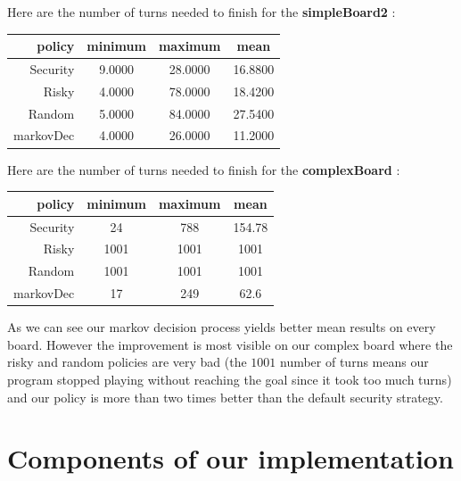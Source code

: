 \documentclass{eplDoc}
\begin{document}
Here are the number of turns needed to finish for the \textbf{simpleBoard2} : 


\begin{center}
		\begin{tabular}{|r|ccc|}
			\hline
			policy & minimum & maximum & mean \\ 
			\hline
			 Security &     9.0000  & 28.0000  & 16.8800 \\
    Risky & 4.0000  & 78.0000 &  18.4200 \\ 
    Random & 5.0000  & 84.0000 &  27.5400 \\ 
    markovDec & 4.0000 &  26.0000  & 11.2000  \\ 
   		\hline
		\end{tabular}
\end{center}

Here are the number of turns needed to finish for the \textbf{complexBoard} : 


\begin{center}
		\begin{tabular}{|r|ccc|}
			\hline  
			policy & minimum & maximum & mean \\ 
			\hline
			 Security &                            24          &             788         &           154.78 \\
       Risky &               1001           &           1001          &            1001 \\ 
       Random &               1001        &             1001             &         1001 \\ 
       markovDec &                 17         &              249             &         62.6 \\ 
 
   		\hline
		\end{tabular}
\end{center}

As we can see our markov decision process yields better mean results on every board. However the improvement is most visible on our complex board where the risky and random policies are very bad (the $1001$ number of turns means our program stopped playing without reaching the goal since it took too much turns) and our policy is more than two times better than the default security strategy. 

\section{Components of our implementation}
\end{document}
